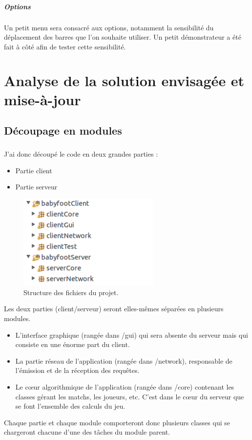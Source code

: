 \documentclass[a4paper,12pt]{report}
\begin{document}
\paragraph{Options}
Un petit menu sera consacré aux options, notamment la sensibilité du déplacement des barres que l'on souhaite utiliser. Un petit démonstrateur a été fait à côté afin de tester cette sensibilité.


\chapter{Analyse de la solution envisagée et mise-à-jour}


\section{Découpage en modules}
\paragraph{}
J'ai donc découpé le code en deux grandes parties :
\begin{itemize}
    \item Partie client
    \item Partie serveur
\end{itemize}
\begin{figure}[H]
	\begin{center}
	\includegraphics[width=07cm]{pictures/structure.png} 
	\end{center}
	\caption{Structure des fichiers du projet.}
    \end{figure}
Les deux parties (client/serveur) seront elles-mêmes séparées en plusieurs modules.
\begin{itemize}
    \item L'interface graphique (rangée dans /gui) qui sera absente du serveur mais qui consiste en une énorme part du client.
    \item La partie réseau de l'application (rangée dans /network), responsable de l'émission et de la réception des requêtes.
    \item Le c\oe{}ur algorithmique de l'application (rangée dans /core) contenant les classes gérant les matchs, les joueurs, etc. C'est dans le c\oe{}ur du serveur que se font l'ensemble des calculs du jeu.
\end{itemize}
Chaque partie et chaque module comporteront donc plusieurs classes qui se chargeront chacune d'une des tâches du module parent.
\end{document}
